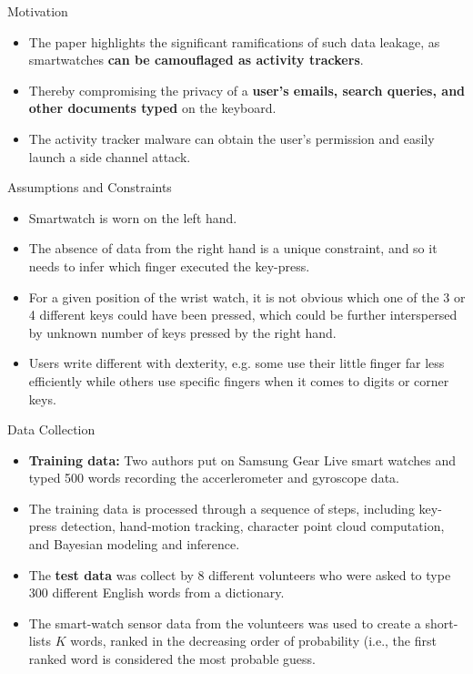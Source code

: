 \documentclass[ucs,9pt]{beamer}
\begin{document}
\begin{frame}{Motivation}
 \begin{itemize}
 	\item The paper highlights the significant ramifications
 	of such data leakage, as smartwatches  \textbf{can be camouflaged
 	as activity trackers}.
 	\item Thereby compromising the privacy of a
 	\textbf{user’s emails, search queries, and other documents typed} on
 	the keyboard. 
 	
 	\item %
 	The activity tracker malware can obtain the	user’s permission and easily launch a side channel attack. 	
 \end{itemize}
\end{frame}

\begin{frame}{Assumptions and Constraints}
	\begin{itemize}
		\item Smartwatch is worn on the left hand.
		\item The absence of data from the right hand is a unique constraint, and so it needs to infer which finger	executed the key-press.
		\item For a given position of the wrist watch, it is not obvious which one of the 3 or 4 different keys could have been pressed, which could be further interspersed by unknown number of keys pressed by the right hand. 
		\item Users write different with dexterity, e.g. some use their little
		finger far less efficiently while others use specific fingers when
		it comes to digits or corner keys.
	\end{itemize}
\end{frame}

\begin{frame}{Data Collection}
	\begin{itemize}
		\item \textbf{Training data:} Two authors put on Samsung Gear Live
		smart watches and typed 500 words recording the accerlerometer and gyroscope data.
		\item The training data is processed through a sequence of steps, including key-press detection, hand-motion tracking,
		character point cloud computation, and Bayesian modeling and
		inference. %
		\item The \textbf{test data} was collect by 8 different volunteers
		who were asked to type 300 different English words from a
		dictionary.
		\item The smart-watch sensor data from the volunteers
		was used to create a short-lists $K$ words, ranked in the
		decreasing order of probability (i.e., the first ranked word is
		considered the most probable guess.
	\end{itemize}	
\end{frame}
\end{document}
